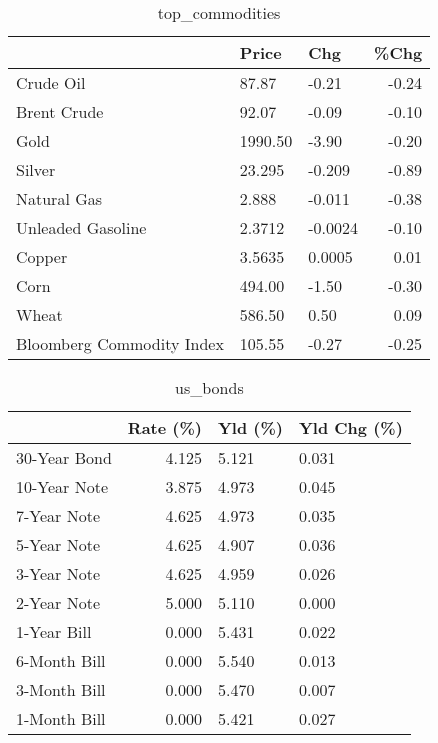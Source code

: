 \documentclass{article}%
\begin{document}
\begin{table}[htbp]%
\caption{top\_commodities}%
\centering%
\begin{adjustbox}{width=1\textwidth}%
\begin{tabular}{lllr}
\toprule
                          &   Price &     Chg &  \%Chg \\
\midrule
               Crude Oil  &   87.87 &   -0.21 & -0.24 \\
             Brent Crude  &   92.07 &   -0.09 & -0.10 \\
                    Gold  & 1990.50 &   -3.90 & -0.20 \\
                  Silver  &  23.295 &  -0.209 & -0.89 \\
             Natural Gas  &   2.888 &  -0.011 & -0.38 \\
       Unleaded Gasoline  &  2.3712 & -0.0024 & -0.10 \\
                  Copper  &  3.5635 &  0.0005 &  0.01 \\
                    Corn  &  494.00 &   -1.50 & -0.30 \\
                   Wheat  &  586.50 &    0.50 &  0.09 \\
Bloomberg Commodity Index &  105.55 &   -0.27 & -0.25 \\
\bottomrule
\end{tabular}
%
\end{adjustbox}%
\end{table}

%


\begin{table}[htbp]%
\caption{us\_bonds}%
\centering%
\begin{adjustbox}{width=1\textwidth}%
\begin{tabular}{lrll}
\toprule
             &  Rate (\%) & Yld (\%) & Yld Chg (\%) \\
\midrule
30-Year Bond &     4.125 &   5.121 &       0.031 \\
10-Year Note &     3.875 &   4.973 &       0.045 \\
 7-Year Note &     4.625 &   4.973 &       0.035 \\
 5-Year Note &     4.625 &   4.907 &       0.036 \\
 3-Year Note &     4.625 &   4.959 &       0.026 \\
 2-Year Note &     5.000 &   5.110 &       0.000 \\
 1-Year Bill &     0.000 &   5.431 &       0.022 \\
6-Month Bill &     0.000 &   5.540 &       0.013 \\
3-Month Bill &     0.000 &   5.470 &       0.007 \\
1-Month Bill &     0.000 &   5.421 &       0.027 \\
\bottomrule
\end{tabular}
%
\end{adjustbox}%
\end{table}
\end{document}
